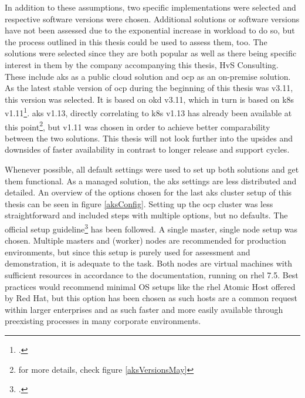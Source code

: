 In addition to these assumptions, two specific implementations were selected and respective software versions were chosen. Additional solutions or software versions have not been assessed due to the exponential increase in workload to do so, but the process outlined in this thesis could be used to assess them, too.
The solutions were selected since they are both popular as well as there being specific interest in them by the company accompanying this thesis, HvS Consulting.
These include \gls{aks} as a public cloud solution and \gls{ocp} as an on-premise solution. As the latest stable version of \gls{ocp} during the beginning of this thesis was v3.11, this version was selected. It is based on \gls{okd} v3.11, which in turn is based on \gls{k8s} v1.11\footcite[][, refer to the second table below the headline 'Platform Components']{ocpK8sVersions}. \gls{aks} v1.13, directly correlating to \gls{k8s} v1.13 has already been available at this point\footnote{for more details, check figure \ref{aksVersionsMay}}, but v1.11 was chosen in order to achieve better comparability between the two solutions. This thesis will not look further into the upsides and downsides of faster availability in contrast to longer release and support cycles.

Whenever possible, all default settings were used to set up both solutions and get them functional. 
As a managed solution, the \gls{aks} settings are less distributed and detailed. An overview of the options chosen for the last \gls{aks} cluster setup of this thesis can be seen in figure \ref{aksConfig}.
Setting up the \gls{ocp} cluster was less straightforward and included steps with multiple options, but no defaults. The official setup guideline\footcite[][, sections 'Planning your installation' to 'Installing OpenShift']{ocpSetup} has been followed. A single master, single node setup was chosen. Multiple masters and (worker) nodes are recommended for production environments, but since this setup is purely used for assessment and demonstration, it is adequate to the task. Both nodes are virtual machines with sufficient resources in accordance to the documentation, running on \gls{rhel} 7.5. Best practices would recommend minimal OS setups like the \gls{rhel} Atomic Host offered by Red Hat, but this option has been chosen as such hosts are a common request within larger enterprises and as such faster and more easily available through preexisting processes in many corporate environments.

